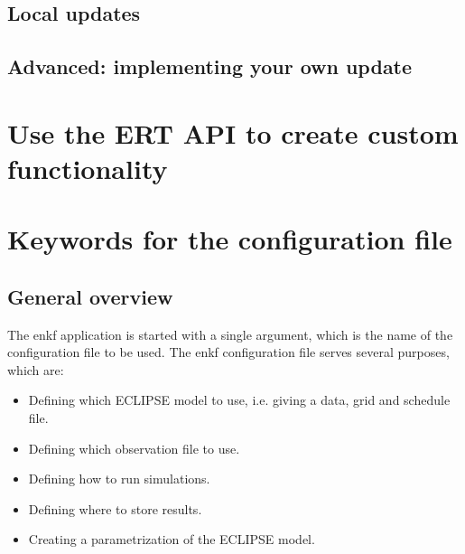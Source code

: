 \documentclass[a4paper,10pt,english]{sphinxmanual}
\begin{document}
\section{Local updates}
\label{\detokenize{update/index:local-updates}}

\section{Advanced: implementing your own update}
\label{\detokenize{update/index:advanced-implementing-your-own-update}}

\chapter{Use the ERT API to create custom functionality}
\label{\detokenize{scripting/index:use-the-ert-api-to-create-custom-functionality}}\label{\detokenize{scripting/index::doc}}

\chapter{Keywords for the configuration file}
\label{\detokenize{keywords/index::doc}}\label{\detokenize{keywords/index:ert-kw-full-doc}}\label{\detokenize{keywords/index:keywords-for-the-configuration-file}}


\section{General overview}
\label{\detokenize{keywords/index:general-overview}}
The enkf application is started with a single argument, which is the name of the
configuration file to be used. The enkf configuration file serves several
purposes, which are:
\begin{itemize}
\item {} 
Defining which ECLIPSE model to use, i.e. giving a data, grid and schedule file.

\item {} 
Defining which observation file to use.

\item {} 
Defining how to run simulations.

\item {} 
Defining where to store results.

\item {} 
Creating a parametrization of the ECLIPSE model.

\end{itemize}
\end{document}
